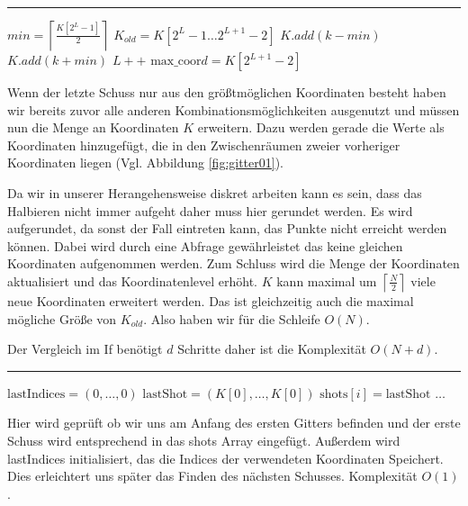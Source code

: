 \documentclass[a4paper,12pt]{llncs}
\numberwithin{equation}{section}
\begin{document}
\smallskip
\hrule
\smallskip
\begin{tcolorbox}
	\begin{algorithmic}
		\State $min=\left\lceil\frac{K[2^L-1]}{2}\right\rceil$
		\State $K_{old}=K\left[2^L-1\dots 2^{L+1}-2\right]$
		\State $K.add(k-min)$
		\EndIf
		\State $K.add(k+min)$
		\EndFor
		\State $L++$
		\State $\text{max\_coor}d=K\left[2^{L+1}-2\right]$
		\EndFunction
	\end{algorithmic}
\end{tcolorbox}

Wenn der letzte Schuss nur aus den größtmöglichen Koordinaten besteht haben wir bereits zuvor alle anderen Kombinationsmöglichkeiten ausgenutzt und müssen nun die Menge an Koordinaten $K$ erweitern. Dazu werden gerade die Werte als Koordinaten hinzugefügt, die in den Zwischenräumen zweier vorheriger Koordinaten liegen (Vgl. Abbildung \ref{fig:gitter01}). 

Da wir in unserer Herangehensweise diskret arbeiten kann es sein, dass das Halbieren nicht immer aufgeht daher muss hier gerundet werden. Es wird aufgerundet, da sonst der Fall eintreten kann, das Punkte nicht erreicht werden können. Dabei wird durch eine Abfrage gewährleistet das keine gleichen Koordinaten aufgenommen werden. Zum Schluss wird die Menge der Koordinaten aktualisiert und das Koordinatenlevel erhöht. $K$ kann maximal um $\left\lceil\frac{N}{2}\right\rceil$ viele neue Koordinaten erweitert werden. Das ist gleichzeitig auch die maximal mögliche Größe von $K_{old}$. Also haben wir für die Schleife $O(N)$. 


Der Vergleich im If benötigt $d$ Schritte daher ist die Komplexität $O\left(N+d\right)$.

\smallskip
\hrule
\smallskip

\begin{tcolorbox}
	\begin{algorithmic}
		\If{$\text{lastShot} = null$}
		\State $\text{lastIndices} = (0,\dots,0)$
		\State $\text{lastShot} = (K[0],\dots,K[0])$
		\State $\text{shots}[i] = \text{lastShot}$
		\Else
		\State $\dots$
		\EndIf
	\end{algorithmic}
\end{tcolorbox}

Hier wird geprüft ob wir uns am Anfang des ersten Gitters befinden und der erste Schuss wird entsprechend in das shots Array eingefügt. Außerdem wird lastIndices initialisiert, das die Indices der verwendeten Koordinaten Speichert. Dies erleichtert uns später das Finden des nächsten Schusses. Komplexität $O(1)$.
\end{document}
